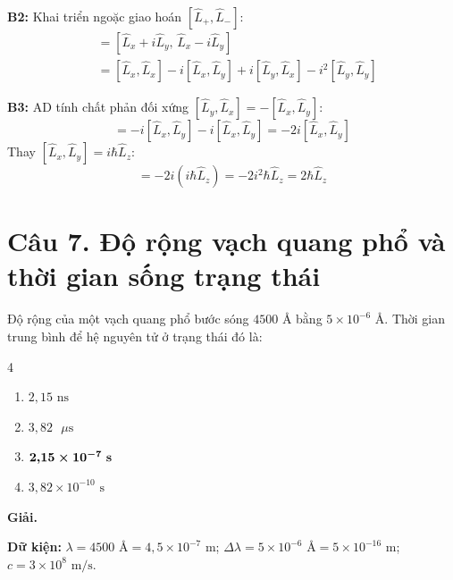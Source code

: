 \documentclass[11pt,a4paper]{article}
\begin{document}
\textbf{B2:} Khai triển ngoặc giao hoán $[\hat{L}_+, \hat{L}_-]$:
\begin{align*}
    [\hat{L}_+, \hat{L}_-] &= [\hat{L}_x + i\hat{L}_y, \, \hat{L}_x - i\hat{L}_y] \\
    &= [\hat{L}_x, \hat{L}_x] - i[\hat{L}_x, \hat{L}_y] + i[\hat{L}_y, \hat{L}_x] - i^2 [\hat{L}_y, \hat{L}_y]
\end{align*}

\textbf{B3:} AD tính chất phản đối xứng $[\hat{L}_y, \hat{L}_x] = -[\hat{L}_x, \hat{L}_y]$:
\begin{equation*}
    [\hat{L}_+, \hat{L}_-] = -i[\hat{L}_x, \hat{L}_y] - i[\hat{L}_x, \hat{L}_y] = -2i[\hat{L}_x, \hat{L}_y]
\end{equation*}
Thay $[\hat{L}_x, \hat{L}_y] = i\hbar\hat{L}_z$:
\begin{equation*}
    [\hat{L}_+, \hat{L}_-] = -2i(i\hbar\hat{L}_z) = -2i^2\hbar\hat{L}_z = 2\hbar\hat{L}_z
\end{equation*}

\vspace{0.5cm}

\section*{Câu 7. Độ rộng vạch quang phổ và thời gian sống trạng thái}

Độ rộng của một vạch quang phổ bước sóng $4500\text{ \AA}$ bằng $5 \times 10^{-6}\text{ \AA}$. Thời gian trung bình để hệ nguyên tử ở trạng thái đó là:

\begin{multicols}{4}
\begin{enumerate}[label=\Alph*., itemsep=1pt, topsep=1pt, parsep=0pt, leftmargin=1.8em]
    \item $2{,}15\text{ ns}$
    \item $3{,}82\text{ }\mu\text{s}$
    \item $\boldsymbol{2{,}15 \times 10^{-7}\text{ \textbf{s}}}$
    \item $3{,}82 \times 10^{-10}\text{ s}$
\end{enumerate}
\end{multicols}

\textbf{Giải.}

\textbf{Dữ kiện:} $\lambda = 4500\text{ \AA} = 4{,}5 \times 10^{-7}\text{ m}$; $\Delta\lambda = 5 \times 10^{-6}\text{ \AA} = 5 \times 10^{-16}\text{ m}$; $c = 3 \times 10^8\text{ m/s}$.
\end{document}

